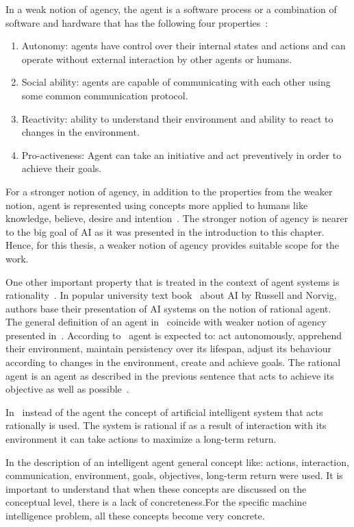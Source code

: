 \documentclass[english, 12pt, a4paper, elec, utf8, online]{aaltothesis}
\begin{document}
In a weak notion of agency, the agent is a software process or a combination of software and hardware that has the following four properties~\cite{wooldridge_jennings94}:

\begin{enumerate}
\item
Autonomy: agents have control over their internal states and actions and can operate without external interaction by other agents or humans.
\item
Social ability: agents are capable of communicating with each other using some common communication protocol. 
\item
Reactivity: ability to understand their environment and ability to react to changes in the environment.
\item
Pro-activeness: Agent can take an initiative and act preventively in order to achieve their goals.
\end{enumerate}

For a stronger notion of agency, in addition to the properties from the weaker notion, agent is represented using concepts more applied to humans like knowledge, believe, desire and intention~\cite{wooldridge_jennings94}. The stronger notion of agency is nearer to the big goal of AI as it was presented in the introduction to this chapter. Hence, for this thesis, a weaker notion of agency provides suitable scope for the work.

One other important property that is treated in the context of agent systems is rationality~\cite{wooldridge_jennings94}. In popular university text book~\cite{AIMA} about AI by Russell and Norvig, authors base their presentation of AI systems on the notion of rational agent. The general definition of an agent in~\cite{AIMA} coincide with weaker notion of agency presented in~\cite{wooldridge_jennings94}. According to~\cite{AIMA}  agent is expected to: act autonomously, apprehend their environment, maintain persistency over its lifespan, adjust its behaviour according to changes in the environment, create and achieve goals. The rational agent is an agent as described in the previous sentence that acts to achieve its objective as well as possible~\cite{AIMA}. 

In~\cite{Jung2018} instead of the agent the concept of artificial intelligent system that acts rationally is used. The system is rational if as a result of interaction with its environment it can take actions to maximize a long-term return.

In the description of an intelligent agent general concept like: actions, interaction, communication, environment, goals, objectives, long-term return were used. It is important to understand that when these concepts are discussed on the conceptual level, there is a lack of concreteness.For the specific machine intelligence problem, all these concepts become very concrete.
\end{document}
